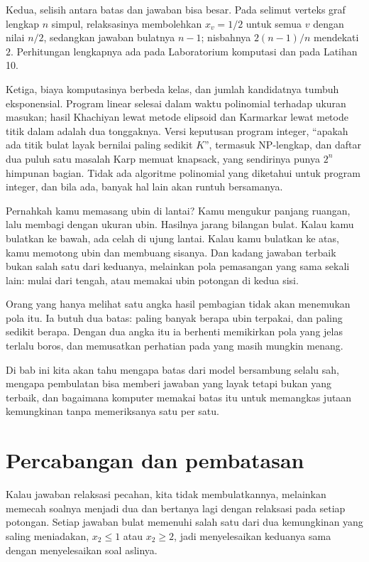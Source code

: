Kedua, selisih antara batas dan jawaban bisa besar. Pada selimut verteks graf
lengkap $n$ simpul, relaksasinya membolehkan $x_{v}=1/2$ untuk semua $v$ dengan nilai $n/2$,
sedangkan jawaban bulatnya $n-1$; nisbahnya $2(n-1)/n$ mendekati $2$. Perhitungan lengkapnya
ada pada Laboratorium komputasi dan pada Latihan 10.

Ketiga, biaya komputasinya berbeda kelas, dan jumlah kandidatnya tumbuh eksponensial. Program
linear selesai dalam waktu polinomial terhadap ukuran masukan; hasil Khachiyan lewat metode
elipsoid dan Karmarkar lewat metode titik dalam adalah dua tonggaknya. Versi keputusan
program integer, ``apakah ada titik bulat layak bernilai paling sedikit $K$'', termasuk
NP-lengkap, dan daftar dua puluh satu masalah Karp memuat knapsack, yang sendirinya punya
$2^{n}$ himpunan bagian. Tidak ada algoritme polinomial yang diketahui untuk program integer,
dan bila ada, banyak hal lain akan runtuh bersamanya.

\begin{untukanak}
Pernahkah kamu memasang ubin di lantai? Kamu mengukur panjang ruangan, lalu membagi dengan
ukuran ubin. Hasilnya jarang bilangan bulat. Kalau kamu bulatkan ke bawah, ada celah di
ujung lantai. Kalau kamu bulatkan ke atas, kamu memotong ubin dan membuang sisanya. Dan
kadang jawaban terbaik bukan salah satu dari keduanya, melainkan pola pemasangan yang sama
sekali lain: mulai dari tengah, atau memakai ubin potongan di kedua sisi.

Orang yang hanya melihat satu angka hasil pembagian tidak akan menemukan pola
itu. Ia butuh dua batas: paling banyak berapa ubin terpakai, dan paling sedikit berapa.
Dengan dua angka itu ia berhenti memikirkan pola yang jelas terlalu boros, dan memusatkan
perhatian pada yang masih mungkin menang.

Di bab ini kita akan tahu mengapa batas dari model bersambung selalu sah, mengapa
pembulatan bisa memberi jawaban yang layak tetapi bukan yang terbaik, dan bagaimana
komputer memakai batas itu untuk memangkas jutaan kemungkinan tanpa memeriksanya satu per
satu.
\end{untukanak}

\section{Percabangan dan pembatasan}

Kalau jawaban relaksasi pecahan, kita tidak membulatkannya, melainkan memecah soalnya
menjadi dua dan bertanya lagi dengan relaksasi pada setiap potongan. Setiap jawaban bulat
memenuhi salah satu dari dua kemungkinan yang saling meniadakan, $x_{2}\le1$ atau
$x_{2}\ge2$, jadi menyelesaikan keduanya sama dengan menyelesaikan soal aslinya.

